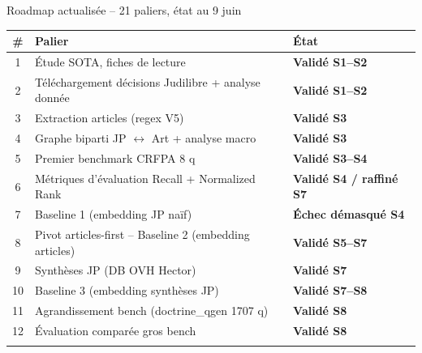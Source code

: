 \documentclass[aspectratio=169,10pt]{beamer}
\begin{document}
\begin{frame}{Roadmap actualisée -- 21 paliers, état au 9 juin}
  \scriptsize
  \renewcommand{\arraystretch}{1.0}
  \begin{center}
  \begin{tabular}{@{}c p{8.8cm} l@{}}
    \toprule
    \textbf{\#} & \textbf{Palier} & \textbf{État} \\
    \midrule
    1  & Étude SOTA, fiches de lecture                                                & \textcolor{ok}{\textbf{Validé S1--S2}} \\
    2  & Téléchargement décisions Judilibre + analyse donnée                         & \textcolor{ok}{\textbf{Validé S1--S2}} \\
    3  & Extraction articles (regex V5)                                              & \textcolor{ok}{\textbf{Validé S3}} \\
    4  & Graphe biparti JP $\leftrightarrow$ Art + analyse macro                     & \textcolor{ok}{\textbf{Validé S3}} \\
    5  & Premier benchmark CRFPA 8 q                                                 & \textcolor{ok}{\textbf{Validé S3--S4}} \\
    6  & Métriques d'évaluation Recall + Normalized Rank                                              & \textcolor{ok}{\textbf{Validé S4 / raffiné S7}} \\
    7  & Baseline 1 (embedding JP naïf)                                              & \textcolor{warn}{\textbf{Échec démasqué S4}} \\
    \rowcolor{accentsoft}
    8  & Pivot articles-first -- Baseline 2 (embedding articles)                     & \textcolor{ok}{\textbf{Validé S5--S7}} \\
    \rowcolor{accentsoft}
    9  & Synthèses JP (DB OVH Hector)                                                & \textcolor{ok}{\textbf{Validé S7}} \\
    \rowcolor{accentsoft}
    10 & Baseline 3 (embedding synthèses JP)                                         & \textcolor{ok}{\textbf{Validé S7--S8}} \\
    \rowcolor{accentsoft}
    11 & Agrandissement bench (doctrine\_qgen 1707 q)                                & \textcolor{ok}{\textbf{Validé S8}} \\
    \rowcolor{accentsoft}
    12 & Évaluation comparée gros bench                                              & \textcolor{ok}{\textbf{Validé S8}} \\
    \rowcolor{accentsoft}

\end{tabular}
\end{center}
\end{frame}
\end{document}
